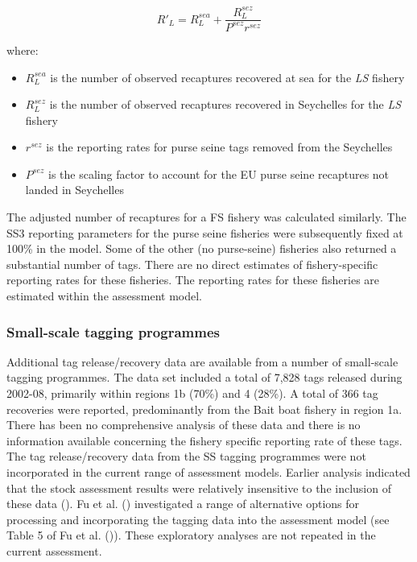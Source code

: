 \documentclass[
]{scrartcl}
\providecommand{\tightlist}{%
  \setlength{\itemsep}{0pt}\setlength{\parskip}{0pt}}\usepackage{longtable,booktabs,array}
\begin{document}
\[R'_L = R_L^{sea} + \frac{R_L^{sez}}{P^{sez}r^{sez}}\]

where:

\begin{itemize}
\tightlist
\item
  \(R_L^{sea}\) is the number of observed recaptures recovered at sea
  for the \emph{LS} fishery
\item
  \(R_L^{sez}\) is the number of observed recaptures recovered in
  Seychelles for the \emph{LS} fishery
\item
  \(r^{sez}\) is the reporting rates for purse seine tags removed from
  the Seychelles
\item
  \(P^{sez}\) is the scaling factor to account for the EU purse seine
  recaptures not landed in Seychelles
\end{itemize}

The adjusted number of recaptures for a FS fishery was calculated
similarly. The SS3 reporting parameters for the purse seine fisheries
were subsequently fixed at 100\% in the model. Some of the other (no
purse-seine) fisheries also returned a substantial number of tags. There
are no direct estimates of fishery-specific reporting rates for these
fisheries. The reporting rates for these fisheries are estimated within
the assessment model.

\subsubsection{Small-scale tagging
programmes}\label{small-scale-tagging-programmes}

Additional tag release/recovery data are available from a number of
small-scale tagging programmes. The data set included a total of 7,828
tags released during 2002-08, primarily within regions 1b (70\%) and 4
(28\%). A total of 366 tag recoveries were reported, predominantly from
the Bait boat fishery in region 1a. There has been no comprehensive
analysis of these data and there is no information available concerning
the fishery specific reporting rate of these tags. The tag
release/recovery data from the SS tagging programmes were not
incorporated in the current range of assessment models. Earlier analysis
indicated that the stock assessment results were relatively insensitive
to the inclusion of these data
(). Fu et al.
() investigated a range
of alternative options for processing and incorporating the tagging data
into the assessment model (see Table 5 of Fu et al.
()). These exploratory
analyses are not repeated in the current assessment.
\end{document}
